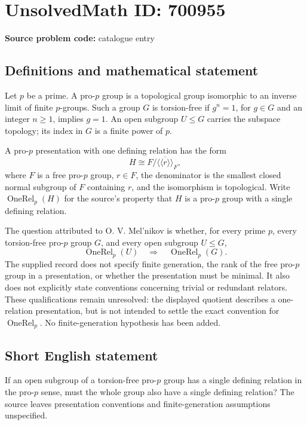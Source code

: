 \documentclass[11pt]{article}
\begin{document}
\section*{UnsolvedMath ID: 700955}
\textbf{Source problem code:} catalogue entry
\subsection{Definitions and mathematical statement}
Let \(p\) be a prime. A pro-\(p\) group is a topological group isomorphic to an inverse limit of finite \(p\)-groups. Such a group \(G\) is torsion-free if \(g^n=1\), for \(g\in G\) and an integer \(n\geq 1\), implies \(g=1\). An open subgroup \(U\leq G\) carries the subspace topology; its index in \(G\) is a finite power of \(p\).

A pro-\(p\) presentation with one defining relation has the form
\[
H\cong F/\overline{\langle\!\langle r\rangle\!\rangle}_F,
\]
where \(F\) is a free pro-\(p\) group, \(r\in F\), the denominator is the smallest closed normal subgroup of \(F\) containing \(r\), and the isomorphism is topological. Write \(\operatorname{OneRel}_p(H)\) for the source's property that \(H\) is a pro-\(p\) group with a single defining relation.

The question attributed to O. V. Mel'nikov is whether, for every prime \(p\), every torsion-free pro-\(p\) group \(G\), and every open subgroup \(U\leq G\),
\[
\operatorname{OneRel}_p(U)\quad\Longrightarrow\quad
\operatorname{OneRel}_p(G).
\]
The supplied record does not specify finite generation, the rank of the free pro-\(p\) group in a presentation, or whether the presentation must be minimal. It also does not explicitly state conventions concerning trivial or redundant relators. These qualifications remain unresolved: the displayed quotient describes a one-relation presentation, but is not intended to settle the exact convention for \(\operatorname{OneRel}_p\). No finite-generation hypothesis has been added.
\subsection{Short English statement}
If an open subgroup of a torsion-free pro-\(p\) group has a single defining relation in the pro-\(p\) sense, must the whole group also have a single defining relation? The source leaves presentation conventions and finite-generation assumptions unspecified.
\end{document}
